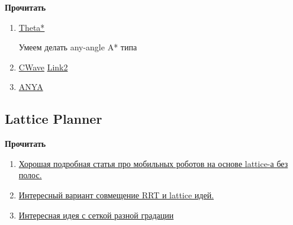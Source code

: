 \documentclass[a4paper,12pt,preview,tikz]{report}
\begin{document}

\textbf{Прочитать}
\begin{enumerate}
    \item \href{https://en.wikipedia.org/wiki/Theta*}{Theta*}

        Умеем делать any-angle A* типа

    \item \href{https://sci-hub.hkvisa.net/10.1109/ICRA.2017.7989733}{CWave} \href{https://sci-hub.hkvisa.net/10.1017/S0263574719000560}{Link2}
    \item \href{https://www.researchgate.net/publication/305175423_Optimal_Any-Angle_Pathfinding_In_Practice}{ANYA}

\end{enumerate}

\subsection{Lattice Planner}

\textbf{Прочитать}
\begin{enumerate}
    \item \href{https://rpal.cs.cornell.edu/docs/PivEtal_JFR_2009.pdf}{Хорошая подробная статья про мобильных роботов на основе lattice-а без полос.} 
    \item \href{https://en.wikipedia.org/wiki/Any-angle_path_plannin://arxiv.org/pdf/1809.02399.pdf}{Интересный вариант совмещение RRT и lattice идей.}
    \item \href{http://persoal.citius.usc.es/manuel.mucientes/pubs/Gonzalez-Sieira18_ras.pdf}{Интересная идея с сеткой разной градации}

\end{enumerate}
\end{document}
